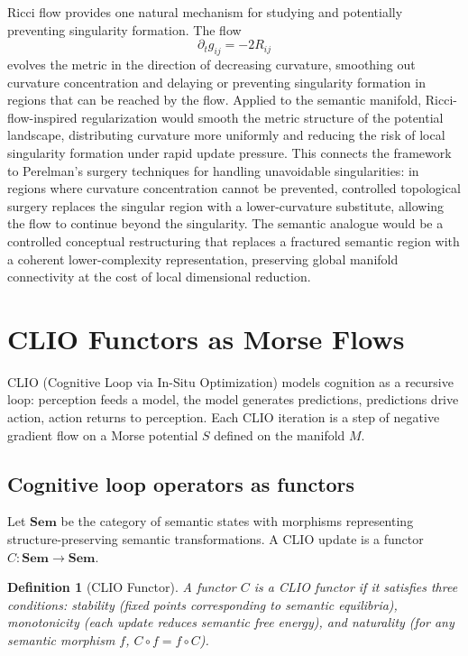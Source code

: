 \documentclass[11pt,a4paper,twocolumn]{article}
\newtheorem{definition}[theorem]{Definition}
\begin{document}
Ricci flow provides one natural mechanism for studying and
potentially preventing singularity formation. The flow
\[
\partial_t g_{ij} = -2 R_{ij}
\]
evolves the metric in the direction of decreasing curvature,
smoothing out curvature concentration and delaying or preventing
singularity formation in regions that can be reached by the flow.
Applied to the semantic manifold, Ricci-flow-inspired regularization
would smooth the metric structure of the potential landscape,
distributing curvature more uniformly and reducing the risk of
local singularity formation under rapid update pressure. This
connects the framework to Perelman's surgery techniques for
handling unavoidable singularities: in regions where curvature
concentration cannot be prevented, controlled topological surgery
replaces the singular region with a lower-curvature substitute,
allowing the flow to continue beyond the singularity. The semantic
analogue would be a controlled conceptual restructuring that
replaces a fractured semantic region with a coherent lower-complexity
representation, preserving global manifold connectivity at the cost
of local dimensional reduction.


\section{CLIO Functors as Morse Flows}

CLIO (Cognitive Loop via In-Situ Optimization) models cognition as a
recursive loop: perception feeds a model, the model generates
predictions, predictions drive action, action returns to perception.
Each CLIO iteration is a step of negative gradient flow on a Morse
potential $S$ defined on the manifold $M$.

\subsection{Cognitive loop operators as functors}

Let $\mathbf{Sem}$ be the category of semantic states with morphisms
representing structure-preserving semantic transformations. A CLIO
update is a functor $C : \mathbf{Sem} \to \mathbf{Sem}$.

\begin{definition}[CLIO Functor]
A functor $C$ is a CLIO functor if it satisfies three conditions:
stability (fixed points corresponding to semantic equilibria),
monotonicity (each update reduces semantic free energy), and naturality
(for any semantic morphism $f$, $C \circ f = f \circ C$).
\end{definition}
\end{document}
